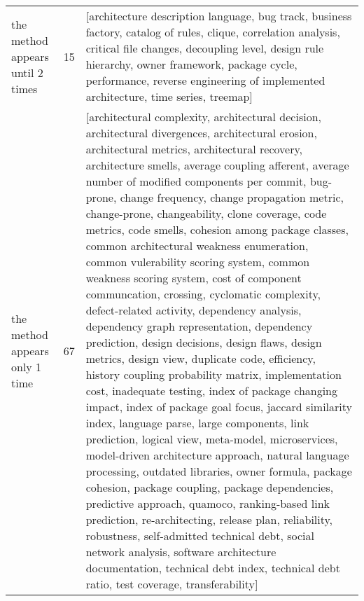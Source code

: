 \begin{tabular}{lrl}
  the method appears until 2 times &     15 &                                                                                                                                                                                                                                                                                                                                                                                                                                                                                                                                                                                                                                                                                                                                                                                                                                                                                                                                                                                                                                                                                                                                                                                                                                [architecture description language, bug track, business factory, catalog of rules, clique, correlation analysis, critical file changes, decoupling level, design rule hierarchy, owner framework, package cycle, performance, reverse engineering of implemented architecture, time series, treemap] \\
    the method appears only 1 time &     67 &  [architectural complexity, architectural decision, architectural divergences, architectural erosion, architectural metrics, architectural recovery, architecture smells, average coupling afferent, average number of modified components per commit, bug-prone, change frequency, change propagation metric, change-prone, changeability, clone coverage, code metrics, code smells, cohesion among package classes, common architectural weakness enumeration, common vulerability scoring system, common weakness scoring system, cost of component communcation, crossing, cyclomatic complexity, defect-related activity, dependency analysis, dependency graph representation, dependency prediction, design decisions, design flaws, design metrics, design view, duplicate code, efficiency, history coupling probability matrix, implementation cost, inadequate testing, index of package changing impact, index of package goal focus, jaccard similarity index, language parse, large components, link prediction, logical view, meta-model, microservices, model-driven architecture approach, natural language processing, outdated libraries, owner formula, package cohesion, package coupling, package dependencies, predictive approach, quamoco, ranking-based link prediction, re-architecting, release plan, reliability, robustness, self-admitted technical debt, social network analysis, software architecture documentation, technical debt index, technical debt ratio, test coverage, transferability] \\
\bottomrule
\end{tabular}
